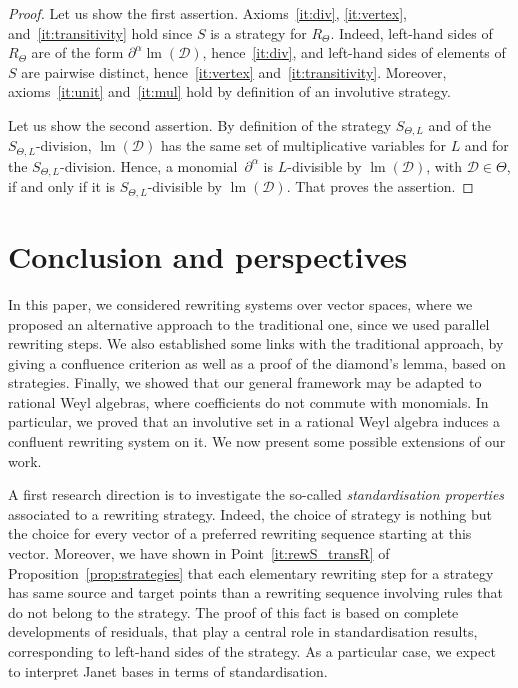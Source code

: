\documentclass[11pt]{article}
\theoremstyle{definition}
\newcommand\D{\mathcal{D}}
\DeclareMathOperator{\lm}{lm}
\newcommand\RTheta{R_{\Theta}}
\newcommand\SThetaL{S_{\Theta,L}}
\begin{document}
\begin{proof}
  Let us show the first assertion. Axioms~\ref{it:div}, \ref{it:vertex},
  and~\ref{it:transitivity} hold since $S$ is a strategy for $\RTheta$.
  Indeed, left-hand sides of $\RTheta$ are of the form
  $\partial^\alpha\lm(\D)$, hence~\ref{it:div}, and left-hand sides of
  elements of $S$ are pairwise distinct, hence~\ref{it:vertex}
  and~\ref{it:transitivity}. Moreover, axioms~\ref{it:unit}
  and~\ref{it:mul} hold by definition of an involutive strategy.

  Let us show the second assertion. By definition of the strategy
  $\SThetaL$ and of the $\SThetaL$-division, $\lm(\D)$ has the same set
  of multiplicative variables for $L$ and for the $\SThetaL$-division.
  Hence, a monomial~$\partial^\alpha$ is $L$-divisible by $\lm(\D)$, with
  $\D\in\Theta$, if and only if it is $\SThetaL$-divisible by $\lm(\D)$.
  That proves the assertion.
\end{proof}

\section{Conclusion and perspectives}

In this paper, we considered rewriting systems over vector spaces, where
we proposed an alternative approach to the traditional one, since we used
parallel rewriting steps. We also established some links with the
traditional approach, by giving a confluence criterion as well as a proof
of the diamond's lemma, based on strategies. Finally, we showed that our
general framework may be adapted to rational Weyl algebras, where
coefficients do not commute with monomials. In particular, we proved that
an involutive set in a rational Weyl algebra induces a confluent
rewriting system on it. We now present some possible extensions of our
work.
\medskip

A first research direction is to investigate the so-called
{\em standardisation properties}~\cite{Mellies05jwklop} associated to a
rewriting strategy. Indeed, the choice of strategy is nothing but the
choice for every vector of a preferred rewriting sequence starting at 
this vector. Moreover, we have shown in Point~\ref{it:rewS_transR} of
Proposition~\ref{prop:strategies} that each elementary rewriting step for
a strategy has same source and target points than a rewriting sequence
involving rules that do not belong to the strategy. The proof of this
fact is based on complete developments of residuals, that play a central
role in standardisation results, corresponding to left-hand sides of the
strategy. As a particular case, we expect to interpret Janet bases in
terms of standardisation.
\medskip
\end{document}

